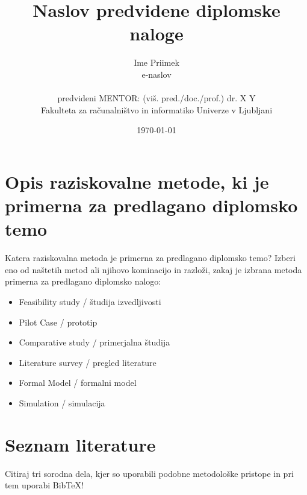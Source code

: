 \documentclass[11pt,a4paper]{article}
\title{Naslov predvidene diplomske naloge}
\author{Ime Priimek\\
e-naslov\\
\ \\
predvideni MENTOR: (viš. pred./doc./prof.) dr. X Y \\
Fakulteta za računalništvo in informatiko Univerze v Ljubljani
\date{\today}         
}
\begin{document}
\maketitle



\section{Opis raziskovalne metode, ki je primerna za predlagano diplomsko temo}

Katera raziskovalna metoda je primerna za predlagano diplomsko temo?
Izberi eno od naštetih metod ali njihovo kominacijo in razloži, zakaj je izbrana metoda primerna za predlagano diplomsko nalogo:
\begin{itemize}
\item Feasibility study / študija izvedljivosti
\item Pilot Case / prototip
\item Comparative study / primerjalna študija
\item Literature survey / pregled literature
\item Formal Model / formalni model
\item Simulation / simulacija
\end{itemize}



\section{Seznam literature}

Citiraj tri sorodna dela, kjer so uporabili podobne metodološke pristope in pri tem uporabi  Bib\TeX!




\end{document}
